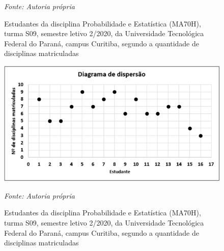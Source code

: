 \begin{enumerate}[label=\emph{\arabic*})]
\begin{enumerate}[label=\emph{\alph*})]
		            \begin{figure}[H]
			            \centering
			            \qquad
			            \caption{
				            Estudantes da disciplina Probabilidade e Estatística (MA70H), turma S09, semestre  letivo  2/2020,  da  Universidade  Tecnológica  Federal  do  Paraná, campus Curitiba, segundo a quantidade de disciplinas matriculadas
			            }
			            \label{fig:d-graph-1}
			            \begin{minipage}{0.7\linewidth}
				            \emph{Fonte: Autoria própria}
			            \end{minipage}
		            \end{figure}

		            \begin{figure}[H]
			            \centering
			            \includegraphics[width=0.7\linewidth]{fig/d-graph-2}
			            \caption{
				            Estudantes da disciplina Probabilidade e Estatística (MA70H), turma S09, semestre  letivo  2/2020,  da  Universidade  Tecnológica  Federal  do  Paraná, campus Curitiba, segundo a quantidade de disciplinas matriculadas
			            }
			            \label{fig:d-graph-2}
			            \begin{minipage}{0.7\linewidth}
				            \emph{Fonte: Autoria própria}
			            \end{minipage}
		            \end{figure}


\end{enumerate}
\end{enumerate}
